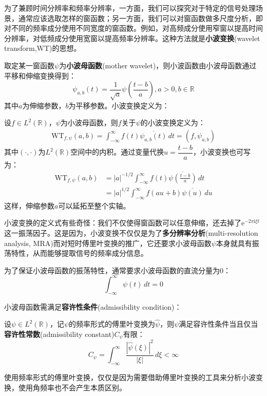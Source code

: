 为了兼顾时间分辨率和频率分辨率，一方面，我们可以探究对于特定的信号处理场景，通常应该选取怎样的窗函数；另一方面，我们可以对窗函数做多尺度分析，即对不同的频率成分使用不同宽度的窗函数。例如，对高频成分使用窄窗以提高时间分辨率，对低频成分使用宽窗以提高频率分辨率。这种方法就是\textbf{小波变换}(wavelet transform,WT)的思想。

取定某一窗函数$\psi$为\textbf{小波母函数}(mother wavelet)，则小波函数由小波母函数通过平移和伸缩变换得到：
\[\psi_{a,b}(t)=\frac{1}{\sqrt{a}}\psi\left(\frac{t-b}{a}\right),a>0,b\in\mathbb{R}\]
其中$a$为伸缩参数，$b$为平移参数。小波变换定义为：
\begin{definition}[小波变换]
    设$f\in L^2(\mathbb{R})$，$\psi$为小波母函数，则$f$关于$\psi$的小波变换定义为：
    \begin{align*}
        \mathrm{WT} _{f,\psi}(a,b)=\int_{-\infty}^{\infty}f(t)\overline{\psi_{a,b}(t)}\,dt=(f,\psi_{a,b})
    \end{align*}
    其中$(\cdot,\cdot)$为$L^2(\mathbb{R})$空间中的内积。通过变量代换$u=\dfrac{t-b}{a}$，小波变换也可写为：
    \begin{align*}
        \mathrm{WT} _{f,\psi}(a,b)&=|a|^{-1/2}\int_{-\infty}^{\infty}f(t)\overline{\psi\left(\frac{t-b}{a}\right)}\,dt\\
        &=|a|^{1/2}\int_{-\infty}^{\infty}f(au+b)\overline{\psi(u)}\,du
    \end{align*}
    这样，伸缩参数$a$可以延拓至整个实轴。
\end{definition}

小波变换的定义式有些奇怪：我们不仅使得窗函数可以任意伸缩，还去掉了$\mathrm{e}^{-2\pi \mathrm{i} \xi t}$这一振荡因子。这是因为，小波变换不仅仅是为了\textbf{多分辨率分析}(multi-resolution analysis, MRA)而对短时傅里叶变换的推广，它还要求小波母函数$\psi$本身就具有振荡特性，从而能够提取信号的频率成分信息。

为了保证小波母函数的振荡特性，通常要求小波母函数的直流分量为0\cite{mathematics_in_signal_processing}：
\[\int_{-\infty}^{\infty}\psi(t)\,dt=0\]

小波母函数需满足\textbf{容许性条件}(admissibility condition)：
\begin{definition}[容许性条件]
    设$\psi\in L^2(\mathbb{R})$，记$\psi$的频率形式的傅里叶变换为$\hat{\psi}$，则$\psi$满足容许性条件当且仅当\textbf{容许性常数}(admissibility constant)$C_{\psi}$有限：
    \[C_{\psi}=\int_{-\infty}^{\infty}\frac{|\hat{\psi}(\xi)|^2}{|\xi|}\,d\xi<\infty\]
\end{definition}

使用频率形式的傅里叶变换，仅仅是因为需要借助傅里叶变换的工具来分析小波变换，使用角频率也不会产生本质区别。

